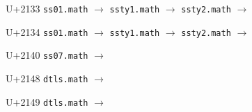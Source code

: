 \documentclass{article}
\begin{document}
\begin{substitutions}
\goodbreak

U+2133  \linebreak
    \texttt{ss01.math} $\to$  \linebreak
    \texttt{ssty1.math} $\to$  \linebreak
    \texttt{ssty2.math} $\to$  

\goodbreak

U+2134  \linebreak
    \texttt{ss01.math} $\to$  \linebreak
    \texttt{ssty1.math} $\to$  \linebreak
    \texttt{ssty2.math} $\to$  

\goodbreak

U+2140  \linebreak
    \texttt{ss07.math} $\to$  

\goodbreak

U+2148  \linebreak
    \texttt{dtls.math} $\to$  

\goodbreak

U+2149  \linebreak
    \texttt{dtls.math} $\to$  

\goodbreak

\end{substitutions}

\clearpage
\end{document}
